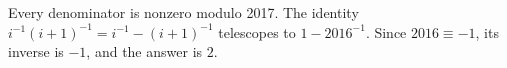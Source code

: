 Every denominator is nonzero modulo 2017. The identity $i^{-1}(i+1)^{-1}=i^{-1}-(i+1)^{-1}$ telescopes to $1-2016^{-1}$. Since $2016\equiv-1$, its inverse is $-1$, and the answer is $\boxed2$.
